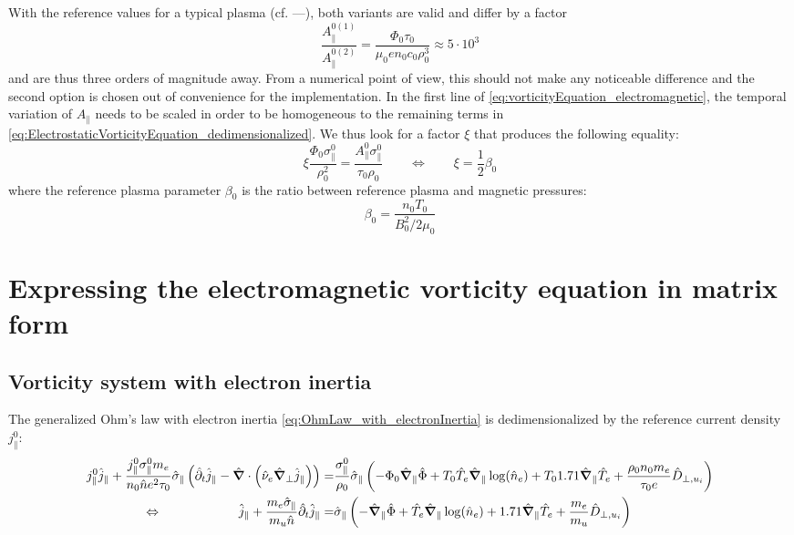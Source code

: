 With the reference values for a typical plasma (cf. ---), both variants are valid and differ by a factor 
$$\frac{A_\parallel^{0(1)}}{A_\parallel^{0(2)}} = \frac{\Phi_0\tau_0}{\mu_0en_0c_0\rho_0^3} \approx 5\cdot 10^3$$ 
and are thus three orders of magnitude away. From a numerical point of view, this should not make any noticeable difference and the second option is chosen out of convenience for the implementation. In the first line of \autoref{eq:vorticityEquation_electromagnetic}, the temporal variation of $A_\parallel$ needs to be scaled in order to be homogeneous to the remaining terms in \autoref{eq:ElectrostaticVorticityEquation_dedimensionalized}. We thus look for a factor $\xi$ that produces the following equality:
$$ \xi \frac{\Phi_0\sigma_\parallel^0}{\rho_0^2} = \frac{A_\parallel^0\sigma_\parallel^0}{\tau_0\rho_0} \qquad\Leftrightarrow\qquad \xi = \frac{1}{2}\beta_0 $$
where the reference plasma parameter $\beta_0$ is the ratio between reference plasma and magnetic pressures: 
$$
\beta_0 = \frac{n_0T_0}{B_0^2 / 2\mu_0}
$$

\section{Expressing the electromagnetic vorticity equation in matrix form}

\subsection{Vorticity system with electron inertia}
The generalized Ohm's law with electron inertia \autoref{eq:OhmLaw_with_electronInertia} is dedimensionalized by the reference current density $j_\parallel^0$:
\begin{align*}
	j_\parallel^0\hat{j}_\parallel + \frac{j_\parallel^0\sigma_\parallel^0m_e}{n_0\hat{n}e^2\tau_0} \hat{\sigma}_\parallel\left(\hat{\partial}_t\hat{j}_\parallel - \hat{\grad}\cdot\left(\hat{\nu}_e\hat{\grad}_\perp \hat{j}_\parallel\right)\right) =& \frac{\sigma_\parallel^0}{\rho_0}\hat{\sigma}_\parallel \left(-\Phi_0 \hat{\grad}_\parallel\hat{\Phi} + T_0\hat{T}_e\hat{\grad}_\parallel\log(\hat{n}_e) + T_01.71\hat{\grad}_\parallel \hat{T}_e + \frac{\rho_0n_0m_e}{\tau_0e}\hat{D}_{\perp,u_i}\right) \\
	\Leftrightarrow\qquad\qquad\qquad
	\hat{j}_\parallel + \frac{m_e\hat{\sigma}_\parallel}{m_u\hat{n}} \hat{\partial}_t\hat{j}_\parallel =& \hat{\sigma}_\parallel \left(-\hat{\grad}_\parallel\hat{\Phi} + \hat{T}_e\hat{\grad}_\parallel\log(\hat{n}_e) + 1.71\hat{\grad}_\parallel \hat{T}_e+\frac{m_e}{m_u}\hat{D}_{\perp,u_i}\right)
\end{align*}


